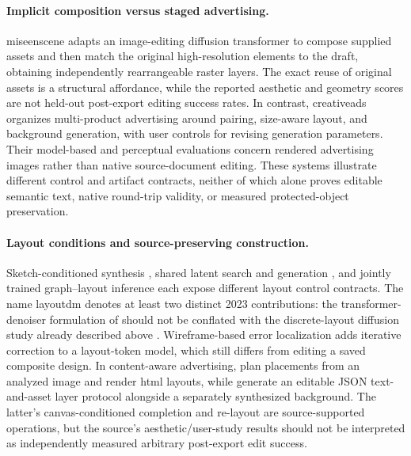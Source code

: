 \paragraph{Implicit composition versus staged advertising.}
\ac{miseenscene} adapts an image-editing diffusion transformer to compose supplied assets and then match the original high-resolution elements to the draft, obtaining independently rearrangeable raster layers.
The exact reuse of original assets is a structural affordance, while the reported aesthetic and geometry scores are not held-out post-export editing success rates.
In contrast, \ac{creativeads} organizes multi-product advertising around pairing, size-aware layout, and background generation, with user controls for revising generation parameters.
Their model-based and perceptual evaluations concern rendered advertising images rather than native source-document editing.
These systems illustrate different control and artifact contracts, neither of which alone proves editable semantic text, native round-trip validity, or measured protected-object preservation.

\paragraph{Layout conditions and source-preserving construction.}
Sketch-conditioned synthesis \citep{brioschi2025sketchtolayout}, shared latent search and generation \citep{manandhar2025class}, and jointly trained graph--layout inference \citep{weng2023learnsample} each expose different layout control contracts.
The name \ac{layoutdm} denotes at least two distinct 2023 contributions: the transformer-denoiser formulation of \citet{chai2023transformerlayoutdm} should not be conflated with the discrete-layout diffusion study already described above \citep{layoutdm2023}.
Wireframe-based error localization \citep{lin2024spoterror} adds iterative correction to a layout-token model, which still differs from editing a saved composite design.
In content-aware advertising, \citet{yoshitake2025adbanner} plan placements from an analyzed image and render \ac{html} layouts, while \citet{zhang2025creatiposter} generate an editable JSON text-and-asset layer protocol alongside a separately synthesized background.
The latter's canvas-conditioned completion and re-layout are source-supported operations, but the source's aesthetic/user-study results should not be interpreted as independently measured arbitrary post-export edit success.

